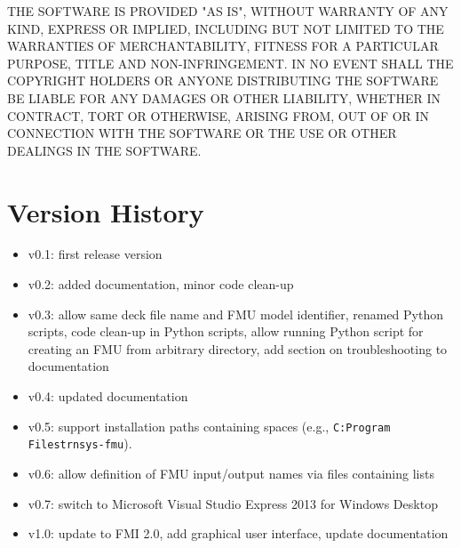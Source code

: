 THE SOFTWARE IS PROVIDED "AS IS", WITHOUT WARRANTY OF ANY KIND, EXPRESS OR
IMPLIED, INCLUDING BUT NOT LIMITED TO THE WARRANTIES OF MERCHANTABILITY,
FITNESS FOR A PARTICULAR PURPOSE, TITLE AND NON-INFRINGEMENT. IN NO EVENT
SHALL THE COPYRIGHT HOLDERS OR ANYONE DISTRIBUTING THE SOFTWARE BE LIABLE
FOR ANY DAMAGES OR OTHER LIABILITY, WHETHER IN CONTRACT, TORT OR OTHERWISE,
ARISING FROM, OUT OF OR IN CONNECTION WITH THE SOFTWARE OR THE USE OR OTHER
DEALINGS IN THE SOFTWARE.

\section{Version History}

\begin{itemize}
  \item v0.1: first release version
  \item v0.2: added documentation, minor code clean-up
  \item v0.3: allow same deck file name and FMU model identifier, renamed Python scripts, code clean-up in Python scripts, allow running Python script for creating an FMU from arbitrary directory, add section on troubleshooting to documentation
  \item v0.4: updated documentation
  \item v0.5: support installation paths containing spaces (e.g., \texttt{C:Program Filestrnsys-fmu}).
  \item v0.6: allow definition of FMU input/output names via files containing lists
  \item v0.7: switch to Microsoft Visual Studio Express 2013 for Windows Desktop
  \item v1.0: update to FMI 2.0, add graphical user interface, update documentation
\end{itemize}
